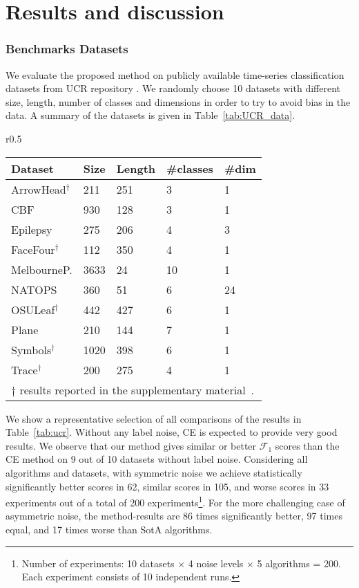 \documentclass[runningheads, envcountsame, a4paper]{llncs}
\newcommand{\F}{\ensuremath{\mathcal{F}}}
\begin{document}
\section{Results and discussion}



\subsubsection{Benchmarks Datasets}
We evaluate the proposed \acrshort{method} on publicly available time-series classification datasets from UCR repository \cite{UCRArchive2018}.
We randomly choose 10 datasets with different size, length, number of classes and dimensions in order to try to avoid bias in the data.
A summary of the datasets is given in Table~\ref{tab:UCR_data}. 
\begin{wraptable}[14]{r}{0.5\textwidth}
    \centering
    \scriptsize
    \caption{UCR Single-variate and Multi-variate dataset description.}
    \label{tab:UCR_data}
    \begin{tabular}{l l l l l}
    \toprule
        \textbf{Dataset} & \textbf{Size} & \textbf{Length} & \textbf{\#classes} & \textbf{\#dim}  \\
    \midrule
         ArrowHead$^\dagger$ & 211 & 251 & 3 & 1 \\
         CBF & 930 & 128 & 3 & 1 \\
         Epilepsy & 275 & 206 & 4 & 3 \\
         FaceFour$^\dagger$ & 112 & 350 & 4 & 1 \\
         MelbourneP. & 3633 & 24 & 10 & 1 \\
         NATOPS & 360 & 51 & 6 & 24 \\
         OSULeaf$^\dagger$ & 442 & 427 & 6 & 1 \\
         Plane & 210 & 144 & 7 & 1 \\
         Symbols$^\dagger$ & 1020 & 398 & 6 & 1 \\
         Trace$^\dagger$ &  200 & 275 & 4 & 1\\
    \bottomrule
    \multicolumn{5}{l}{$\dagger$ results reported in the supplementary material~\cite{castellaniSuppl2021}.}
    \end{tabular}
\end{wraptable}

We show a representative selection of all comparisons of the results in Table~\ref{tab:ucr}. 
Without any label noise, CE is expected to provide very good results. We observe that our \acrshort{method} gives similar or better $\F_1$ scores than the CE method on 9 out of 10 datasets without label noise.
Considering all algorithms and datasets, with symmetric noise we achieve statistically significantly better scores in 62, similar scores in 105, and worse scores in 33 experiments out of a total of 200 experiments\footnote{Number of experiments: 10 datasets $\times$ 4 noise levels $\times$ 5 algorithms = 200. Each experiment consists of 10 independent runs. }. 
For the more challenging case of asymmetric noise, the \acrshort{method}-results are 86 times significantly better, 97 times equal, and 17 times worse than SotA algorithms.
\end{document}
